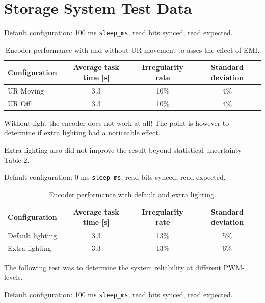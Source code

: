 

\section{Storage System Test Data}
\label{app:extra-data-collection}


Default configuration: 100 ms \texttt{sleep\_ms}, read bits synced, read expected.

\begin{table}[H]
\centering
\begin{tabular}{|l|c|c|c|}
\hline
Configuration & Average task time [s] & Irregularity rate & Standard deviation \\
\hline
UR Moving & 3.3 & 10\%& 4\% \\
UR Off & 3.3 & 10\% & 4\% \\

\hline
\end{tabular}
\caption{Encoder performance with and without UR movement to asses the effect of EMI.}
\label{tab:encoder-performance-ur}
\end{table}

Without light the encoder does not work at all! The point is however to determine if extra lighting had a noticeable effect.

Extra lighting also did not improve the result beyond statistical uncertainty  Table \ref{tab:encoder-performance-lighting}. %



Default configuration: 0 ms \texttt{sleep\_ms}, read bits synced, read expected.

\begin{table}[H]
\centering
\begin{tabular}{|l|c|c|c|}
\hline
Configuration & Average task time [s] & Irregularity rate & Standard deviation \\
\hline
Default lighting & 3.3 & 13\%& 5\% \\
Extra lighting & 3.3 & 13\% & 6\% \\

\hline
\end{tabular}
\caption{Encoder performance with default and extra lighting.}
\label{tab:encoder-performance-lighting}
\end{table}

The following test was to determine the system reliability at different PWM-levels.

Default configuration: 100 ms \texttt{sleep\_ms}, read bits synced, read expected.

